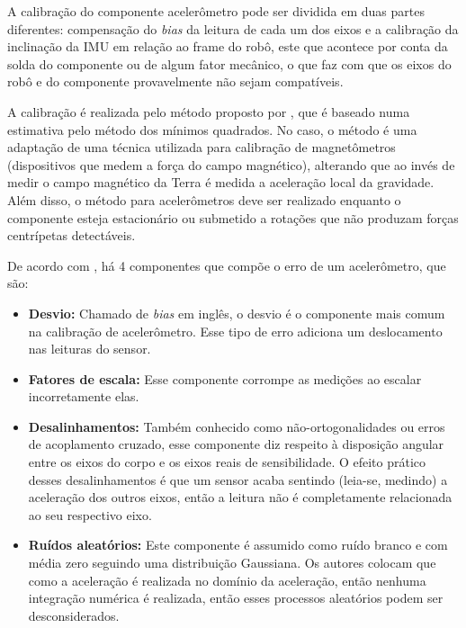 \documentclass[acronym, symbols, table]{fei}
\begin{document}
			A calibração do componente acelerômetro pode ser dividida em duas partes diferentes: compensação do \textit{bias} da leitura de cada um dos eixos e a calibração da inclinação da IMU em relação ao frame do robô, este que acontece por conta da solda do componente ou de algum fator mecânico, o que faz com que os eixos do robô e do componente provavelmente não sejam compatíveis.
			
			A calibração é realizada pelo método proposto por \textcite{menezes2020triaxial}, que é baseado numa estimativa pelo método dos mínimos quadrados. No caso, o método é uma adaptação de uma técnica utilizada para calibração de magnetômetros (dispositivos que medem a força do campo magnético), alterando que ao invés de medir o campo magnético da Terra é medida a aceleração local da gravidade. Além disso, o método para acelerômetros deve ser realizado enquanto o componente esteja estacionário ou submetido a rotações que não produzam forças centrípetas detectáveis.
			
			De acordo com \textcite{menezes2020triaxial}, há 4 componentes que compõe o erro de um acelerômetro, que são:
			
			\begin{itemize}
				\item \textbf{Desvio:} Chamado de \textit{bias} em inglês, o desvio é o componente mais comum na calibração de acelerômetro. Esse tipo de erro adiciona um deslocamento nas leituras do sensor.
				
				\item \textbf{Fatores de escala:} Esse componente corrompe as medições ao escalar incorretamente elas.
				
				\item \textbf{Desalinhamentos:} Também conhecido como não-ortogonalidades ou erros de acoplamento cruzado, esse componente diz respeito à disposição angular entre os eixos do corpo e os eixos reais de sensibilidade. O efeito prático desses desalinhamentos é que um sensor acaba sentindo (leia-se, medindo) a aceleração dos outros eixos, então a leitura não é completamente relacionada ao seu respectivo eixo.
				
				\item \textbf{Ruídos aleatórios:} Este componente é assumido como ruído branco e com média zero seguindo uma distribuição Gaussiana. Os autores colocam que como a aceleração é realizada no domínio da aceleração, então nenhuma integração numérica é realizada, então esses processos aleatórios podem ser desconsiderados.
			\end{itemize}
			
\end{document}
